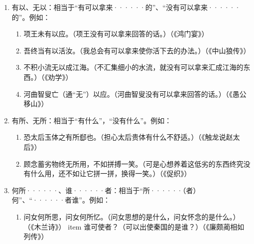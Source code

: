 \begin{enumerate}
\begin{enumerate}[label=\textcircled{\arabic*}]
		\item 如今人方为刀俎，我为鱼肉，何辞为（为什么要告辞呢）？（《鸿门宴》）
		\item 天之亡我，我何渡为（我为什么要渡过江呢）？（《史记·项羽本纪》）
		\item 吾英王，奚跪汝为（我是英王，为什么要跪着你呢）？（《陈玉成》）
	\end{enumerate}
	\newpage
	\item 有以、无以：相当于“有可以拿来······的”、“没有可以拿来······的”。例如：
	\begin{enumerate}[label=\textcircled{\arabic*}]
		\item 项王未有以应。（项王没有可以拿来回答的话。）（《鸿门宴》）
		\item 吾终当有以活汝。（我总会有可以拿来使你活下去的办法。）（《中山狼传》）
		\item 不积小流无以成江海。（不汇集细小的水流，就没有可以拿来汇成江海的东西。）（《劝学》）
		\item 河曲智叟亡（通“无”）以应。（河曲智叟没有可以拿来回答的话。）（《愚公移山》）
	\end{enumerate}
	\item 有所、无所：相当于“有什么”，“没有什么”。例如：
	\begin{enumerate}[label=\textcircled{\arabic*}]
		\item 恐太后玉体之有所郄也。（担心太后贵体有什么不舒适。）（《触龙说赵太后》）
		\item 顾念蓄劣物终无所用，不如拼搏一笑。（可是心想养着这低劣的东西终究没有什么用，还不如让它拼一拼，换得一笑。）（《促织》）
	\end{enumerate}
	\item 何所······、谁······者：相当于“所······（者）何”、“······者谁”。例如：
	\begin{enumerate}[label=\textcircled{\arabic*}]
		\item 问女何所思，问女何所忆。（问女思想的是什么，问女怀念的是什么。）（《木兰诗》）
		item 谁可使者？（可以出使秦国的是谁？）（《廉颇蔺相如列传》）
	\end{enumerate}
\end{enumerate}
\newpage